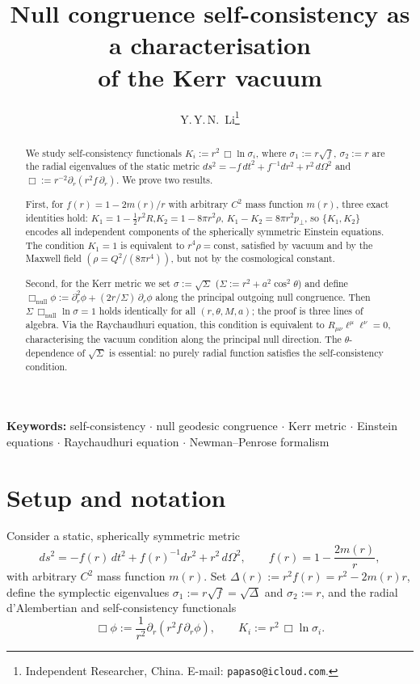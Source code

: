 \documentclass[11pt,a4paper]{article}
\title{\textbf{Null congruence self-consistency as a characterisation\\
of the Kerr vacuum}}
\author{Y.\,Y.\,N.\ Li\footnote{Independent Researcher,
China. E-mail: \texttt{papaso@icloud.com}.}}
\date{}
\begin{document}
\maketitle

\begin{abstract}
We study self-consistency functionals $K_i:=r^2\,\Box\ln\sigma_i$,
where $\sigma_1:=r\sqrt{f}$, $\sigma_2:=r$ are the radial
eigenvalues of the static metric
$ds^2=-f\,dt^2+f^{-1}dr^2+r^2\,d\Omega^2$
and $\Box:=r^{-2}\partial_r(r^2 f\,\partial_r)$.
We prove two results.

First, for $f(r)=1-2m(r)/r$ with arbitrary $C^2$ mass function
$m(r)$, three exact identities hold:
$K_1=1-\tfrac{1}{2}r^2R$,\;$K_2=1-8\pi r^2\rho$,\;
$K_1-K_2=8\pi r^2 p_{\!\perp}$,
so $\{K_1,K_2\}$ encodes all independent components of the
spherically symmetric Einstein equations.
The condition $K_1=1$ is equivalent to $r^4\rho=\mathrm{const}$,
satisfied by vacuum and by the Maxwell field
$(\rho=Q^2/(8\pi r^4))$, but not by the cosmological constant.

Second, for the Kerr metric we set $\sigma:=\sqrt{\Sigma}$
($\Sigma:=r^2+a^2\cos^2\!\theta$) and define
$\Box_{\mathrm{null}}\phi:=\partial_r^2\phi+(2r/\Sigma)\,\partial_r\phi$
along the principal outgoing null congruence.
Then $\Sigma\,\Box_{\mathrm{null}}\ln\sigma=1$ holds identically
for all $(r,\theta,M,a)$; the proof is three lines of algebra.
Via the Raychaudhuri equation, this condition is equivalent to
$R_{\mu\nu}\ell^\mu\ell^\nu=0$, characterising the vacuum
condition along the principal null direction.
The $\theta$-dependence of $\sqrt{\Sigma}$ is essential: no
purely radial function satisfies the self-consistency condition.
\end{abstract}

\medskip
\noindent\textbf{Keywords:} self-consistency $\cdot$ null geodesic congruence
$\cdot$ Kerr metric $\cdot$ Einstein equations
$\cdot$ Raychaudhuri equation $\cdot$ Newman--Penrose formalism

\section{Setup and notation}

Consider a static, spherically symmetric metric
\begin{equation}\label{eq:metric}
  ds^2 = -f(r)\,dt^2 + f(r)^{-1}dr^2 + r^2\,d\Omega^2,
  \qquad f(r)=1-\frac{2m(r)}{r},
\end{equation}
with arbitrary $C^2$ mass function $m(r)$.
Set $\Delta(r):=r^2 f(r)=r^2-2m(r)r$, define the symplectic
eigenvalues $\sigma_1:=r\sqrt{f}=\sqrt{\Delta}$ and $\sigma_2:=r$,
and the radial d'Alembertian and self-consistency functionals
\begin{equation}
  \Box\phi:=\frac{1}{r^2}\partial_r(r^2 f\,\partial_r\phi),
  \qquad
  K_i:=r^2\,\Box\ln\sigma_i.
\end{equation}
\end{document}
